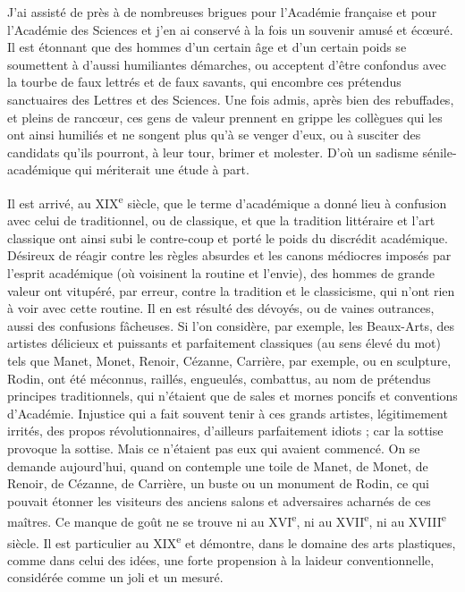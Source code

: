 \documentclass[french,twoside]{book} %
\begin{document}
J’ai assisté de près à de nombreuses brigues pour l’Académie française et pour l’Académie des Sciences et j’en ai conservé à la fois un souvenir amusé et écœuré. Il est étonnant que des hommes d’un certain âge et d’un certain poids se soumettent à d’aussi humiliantes démarches, ou acceptent d’être confondus avec la tourbe de faux lettrés et de faux savants, qui encombre ces prétendus sanctuaires des Lettres et des Sciences. Une fois admis, après bien des rebuffades, et pleins de rancœur, ces gens de valeur prennent en grippe les collègues qui les ont ainsi humiliés et ne songent plus qu’à se venger d’eux, ou à susciter des candidats qu’ils pourront, à leur tour, brimer et molester. D’où un sadisme sénile-académique qui mériterait une étude à part.\par
Il est arrivé, au XIX\textsuperscript{e} siècle, que le terme d’académique a donné lieu à confusion avec celui de traditionnel, ou de classique, et que la tradition littéraire et l’art classique ont ainsi subi le contre-coup et porté le poids du discrédit académique. Désireux de réagir contre les règles absurdes et les canons médiocres imposés par l’esprit académique (où voisinent la routine et l’envie), des hommes de grande valeur ont vitupéré, par erreur, contre la tradition et le classicisme, qui n’ont rien à voir avec cette routine. Il en est résulté des dévoyés, ou de vaines outrances, aussi des confusions fâcheuses. Si l’on considère, par exemple, les Beaux-Arts, des artistes délicieux et puissants et parfaitement classiques (au sens élevé du mot) tels que Manet, Monet, Renoir, Cézanne, Carrière, par exemple, ou en sculpture, Rodin, ont été méconnus, raillés, engueulés, combattus, au nom de prétendus principes traditionnels, qui n’étaient que de sales et mornes poncifs et conventions d’Académie. Injustice qui a fait souvent tenir à ces grands artistes, légitimement irrités, des propos révolutionnaires, d’ailleurs parfaitement idiots ; car la sottise provoque la sottise. Mais ce n’étaient pas eux qui avaient commencé. On se demande aujourd’hui, quand on contemple une toile de Manet, de Monet, de Renoir, de Cézanne, de Carrière, un buste ou un monument de Rodin, ce qui pouvait étonner les visiteurs des anciens salons et adversaires acharnés de ces maîtres. Ce manque de goût ne se trouve ni au XVI\textsuperscript{e}, ni au XVII\textsuperscript{e}, ni au XVIII\textsuperscript{e} siècle. Il est particulier au XIX\textsuperscript{e} et démontre, dans le domaine des arts plastiques, comme dans celui des idées, une forte propension à la laideur conventionnelle, considérée comme un joli et un mesuré.\par
\end{document}
